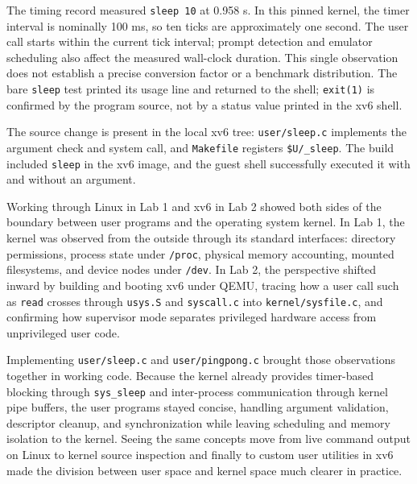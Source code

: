 \documentclass{assets/utmreport}
\begin{document}
The timing record measured \texttt{sleep 10} at 0.958 s. In this pinned kernel, the timer interval is nominally 100 ms, so ten ticks are approximately one second. The user call starts within the current tick interval; prompt detection and emulator scheduling also affect the measured wall-clock duration. This single observation does not establish a precise conversion factor or a benchmark distribution. The bare \texttt{sleep} test printed its usage line and returned to the shell; \texttt{exit(1)} is confirmed by the program source, not by a status value printed in the xv6 shell.

The source change is present in the local xv6 tree: \texttt{user/sleep.c} implements the argument check and system call, and \texttt{Makefile} registers \texttt{\$U/\_sleep}. The build included \texttt{sleep} in the xv6 image, and the guest shell successfully executed it with and without an argument.

\utmconclusions
Working through Linux in Lab 1 and xv6 in Lab 2 showed both sides of the boundary between user programs and the operating system kernel. In Lab 1, the kernel was observed from the outside through its standard interfaces: directory permissions, process state under \texttt{/proc}, physical memory accounting, mounted filesystems, and device nodes under \texttt{/dev}. In Lab 2, the perspective shifted inward by building and booting xv6 under QEMU, tracing how a user call such as \texttt{read} crosses through \texttt{usys.S} and \texttt{syscall.c} into \texttt{kernel/sysfile.c}, and confirming how supervisor mode separates privileged hardware access from unprivileged user code.

Implementing \texttt{user/sleep.c} and \texttt{user/pingpong.c} brought those observations together in working code. Because the kernel already provides timer-based blocking through \texttt{sys\_sleep} and inter-process communication through kernel pipe buffers, the user programs stayed concise, handling argument validation, descriptor cleanup, and synchronization while leaving scheduling and memory isolation to the kernel. Seeing the same concepts move from live command output on Linux to kernel source inspection and finally to custom user utilities in xv6 made the division between user space and kernel space much clearer in practice.
\end{document}
